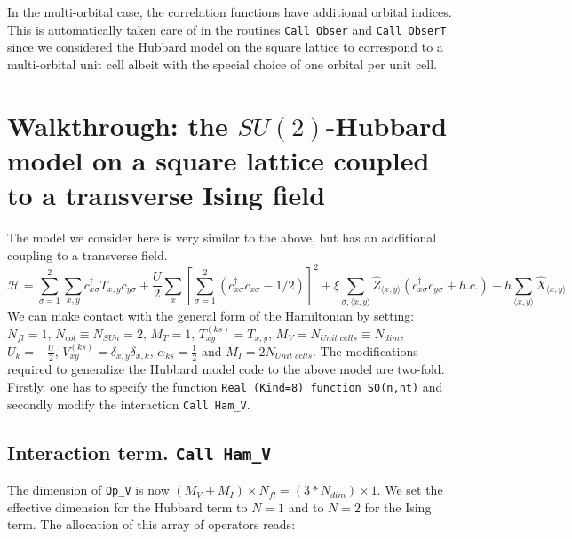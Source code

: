 In the multi-orbital case,  the correlation functions have additional orbital indices. This is automatically taken care of in the routines \texttt{Call Obser} and \texttt{Call ObserT}  since  we considered the  Hubbard model on the square lattice to correspond to a multi-orbital unit cell albeit with the special choice of one orbital per unit cell. 

 
\section{Walkthrough: the $SU(2)$-Hubbard model on a square lattice coupled to a transverse Ising field}\label{sec:walk2}


The model we consider here  is very similar to the  above,  but has an additional coupling to a transverse field. 
\begin{equation}
\label{eqn_hubbard_sun_Ising}
\mathcal{H}=
\sum\limits_{\sigma=1}^{2} 
\sum\limits_{x,y } 
  c^{\dagger}_{x \sigma} T_{x,y}c^{\phantom\dagger}_{y \sigma} 
+ \frac{U}{2}\sum\limits_{x}\left[
\sum\limits_{\sigma=1}^{2}
\left(  c^{\dagger}_{x \sigma} c^{\phantom\dagger}_{x \sigma}  -1/2 \right) \right]^{2}   
+  \xi \sum_{\sigma,\langle x,y \rangle} \hat{Z}_{\langle x,y \rangle}  \left( c^{\dagger}_{x \sigma} c^{\phantom\dagger}_{y \sigma}  + h.c. \right) + h \sum_{\langle x,y \rangle} \hat{X}_{\langle x,y \rangle}
\end{equation}
We can make contact with the general form of the Hamiltonian by setting: 
$N_{fl} = 1$, $N_{col} \equiv N_{SUn}     =2 $,   $M_T    =    1$,  $T^{(ks)}_{x y}   =  T_{x,y}$,  $M_V   =  N_{Unit\; cells} \equiv N_{dim}$,  $U_{k}       =   -\frac{U}{2}$, 
 $V_{x y}^{(ks)} =  \delta_{x,y} \delta_{x,k}$,  $\alpha_{ks}   =  \frac{1}{2}  $ and $M_I       = 2 N_{Unit\; cells} $.
The modifications  required to generalize the Hubbard model code to the above model are two-fold.  Firstly, one has to specify the function \texttt{Real (Kind=8) function S0(n,nt)} and  secondly  modify the interaction \texttt{Call Ham\_V}.


\subsection{Interaction term. \texttt{Call Ham\_V}}
The dimension of   \texttt{Op\_V}  is now  $(M_V + M_I)\times N_{fl}=(3*N_{dim}) \times 1$. 
We set the effective dimension  for the Hubbard term to  $N=1$  and to  $N=2$ for the Ising term. The allocation of this array of operators reads: 

